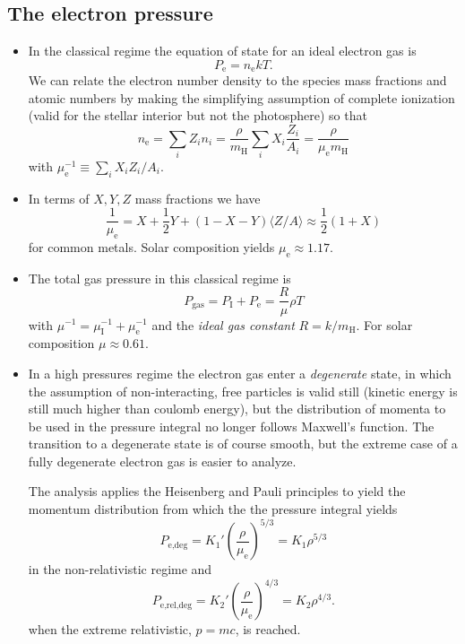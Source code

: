 \documentclass[10pt,amsmath,amssymb,aps,pra]{revtex4-2}
\newcommand{\sub}[1]{_{\text{#1}}}
\newcommand{\mh}{m\sub{H}}
\newcommand{\mean}[1]{\langle{#1}\rangle}
\begin{document}
\subsection{The electron pressure}
\begin{itemize}
\item In the classical regime the equation of state for an ideal electron gas is
\begin{equation}
P\sub{e} = n\sub{e}kT.
\end{equation}
We can relate the electron number density to the species mass fractions and
atomic numbers by making the simplifying assumption of complete ionization 
(valid for the stellar interior but not the photosphere) so that
\begin{equation}
n\sub{e} = \sum_iZ_in_i = \frac{\rho}{\mh}\sum_iX_i\frac{Z_i}{A_i} =
\frac{\rho}{\mu\sub{e}\mh}
\end{equation}
with $\mu\sub{e}^{-1}\equiv\sum_iX_iZ_i/A_i$.

\item In terms of $X,Y,Z$ mass fractions we have
\begin{equation}
\frac{1}{\mu\sub{e}} = X + \frac{1}{2}Y + (1 - X - Y)\mean{Z/A}
\approx \frac{1}{2}(1 + X)
\end{equation}
for common metals. Solar composition yields $\mu\sub{e}\approx{1.17}.$

\item The total gas pressure in this classical regime is
\begin{equation}
P\sub{gas} = P\sub{I} + P\sub{e} = \frac{R}{\mu}\rho{T}
\end{equation}
with $\mu^{-1}=\mu\sub{I}^{-1}+\mu\sub{e}^{-1}$ and the \emph{ideal gas
constant} $R=k/\mh$. For solar composition $\mu\approx{0.61}$.

\item In a high pressures regime the electron gas enter a \emph{degenerate}
state, in which the assumption of non-interacting, free particles is valid still
(kinetic energy is still much higher than coulomb energy), but the distribution
of momenta to be used in the pressure integral no longer follows Maxwell's
function. The transition to a degenerate state is of course smooth, but the
extreme case of a fully degenerate electron gas is easier to analyze.

The analysis applies the Heisenberg and Pauli principles to yield the momentum
distribution from which the the pressure integral yields
\begin{equation}
P\sub{e,deg}=K_1'\left(\frac{\rho}{\mu\sub{e}}\right)^{5/3}=K_1\rho^{5/3}
\end{equation}
in the non-relativistic regime and
\begin{equation}
P\sub{e,rel,deg}=K_2'\left(\frac{\rho}{\mu\sub{e}}\right)^{4/3}=K_2\rho^{4/3}.
\end{equation}
when the extreme relativistic, $p=mc$, is reached.


\end{itemize}
\end{document}
